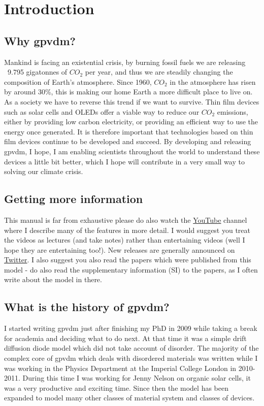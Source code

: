 \section{Introduction}
\subsection{Why gpvdm?}
Mankind is facing an existential crisis, by burning fossil fuels we are releasing ~9.795 gigatonnes of $CO_2$ per year, and thus we are steadily changing the composition of Earth's atmosphere. Since 1960, $CO_{2}$ in the atmosphere has risen by around 30\%, this is making our home Earth a more difficult place to live on. As a society we have to reverse this trend if we want to survive. Thin film devices such as solar cells and OLEDs offer a viable way to reduce our $CO_{2}$ emissions, either by providing low carbon electricity, or providing an efficient way to use the energy once generated. It is therefore important that technologies based on thin film devices continue to be developed and succeed. By developing and releasing gpvdm, I hope, I am enabling scientists throughout the world to understand these devices a little bit better, which I hope will contribute in a very small way to solving our climate crisis.



\subsection{Getting more information}
This manual is far from exhaustive please do also watch the \href{https://www.youtube.com/channel/UCbm_0AKX1SpbMMT7jilxFfA}{YouTube} channel where I describe many of the features in more detail. I would suggest you treat the videos as lectures (and take notes) rather than entertaining videos (well I hope they are entertaining too!). New releases are generally announced on \href{https://twitter.com/gpvdm_info}{Twitter}.  I also suggest you also read the papers which were published from this model - do also read the supplementary information (SI) to the papers, as I often write about the model in there.

\subsection{What is the history of gpvdm?}
I started writing gpvdm just after finishing my PhD in 2009 while taking a break for academia and deciding what to do next. At that time it was a simple drift diffusion diode model which did not take account of disorder. The majority of the complex core of gpvdm which deals with disordered materials was written while I was working in the Physics Department at the Imperial College London in 2010-2011. During this time I was working for Jenny Nelson on organic solar cells, it was a very productive and exciting time. Since then the model has been expanded to model many other classes of material system and classes of devices.

